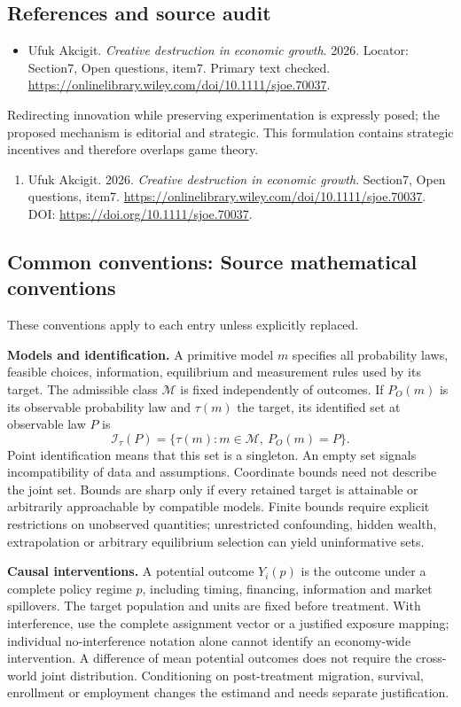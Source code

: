 \documentclass[11pt,a4paper]{article}
\begin{document}
\subsection*{References and source audit}
\begin{itemize}
\item Ufuk Akcigit. \emph{Creative destruction in economic growth}. 2026. Locator: Section7, Open questions, item7. Primary text checked. \url{https://onlinelibrary.wiley.com/doi/10.1111/sjoe.70037}.
\end{itemize}
Redirecting innovation while preserving experimentation is expressly posed; the proposed mechanism is editorial and strategic. This formulation contains strategic incentives and therefore overlaps game theory.
\begin{enumerate}\raggedright
\item\hypertarget{definitions:source:30007551:1}{} Ufuk Akcigit. 2026. \emph{Creative destruction in economic growth}. Section7, Open questions, item7.
\url{https://onlinelibrary.wiley.com/doi/10.1111/sjoe.70037}.
DOI: \url{https://doi.org/10.1111/sjoe.70037}.
\end{enumerate}

\subsection*{Common conventions: Source mathematical conventions}

These conventions apply to each entry unless explicitly replaced.

\textbf{Models and identification.} A primitive model \(m\) specifies all probability laws, feasible choices, information, equilibrium and measurement rules used by its target. The admissible class \(\mathcal M\) is fixed independently of outcomes. If \(P_O(m)\) is its observable probability law and \(\tau(m)\) the target, its identified set at observable law \(P\) is
\[
 \mathcal I_\tau(P)=\{\tau(m):m\in\mathcal M,\ P_O(m)=P\}.
\]
Point identification means that this set is a singleton. An empty set signals incompatibility of data and assumptions. Coordinate bounds need not describe the joint set. Bounds are sharp only if every retained target is attainable or arbitrarily approachable by compatible models. Finite bounds require explicit restrictions on unobserved quantities; unrestricted confounding, hidden wealth, extrapolation or arbitrary equilibrium selection can yield uninformative sets.

\textbf{Causal interventions.} A potential outcome \(Y_i(p)\) is the outcome under a complete policy regime \(p\), including timing, financing, information and market spillovers. The target population and units are fixed before treatment. With interference, use the complete assignment vector or a justified exposure mapping; individual no-interference notation alone cannot identify an economy-wide intervention. A difference of mean potential outcomes does not require the cross-world joint distribution. Conditioning on post-treatment migration, survival, enrollment or employment changes the estimand and needs separate justification.
\end{document}
